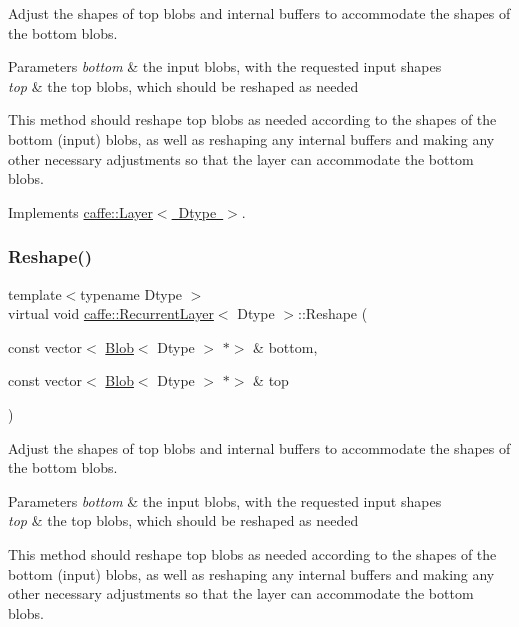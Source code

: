 Adjust the shapes of top blobs and internal buffers to accommodate the shapes of the bottom blobs. 


\begin{DoxyParams}{Parameters}
{\em bottom} & the input blobs, with the requested input shapes \\
\hline
{\em top} & the top blobs, which should be reshaped as needed\\
\hline
\end{DoxyParams}
This method should reshape top blobs as needed according to the shapes of the bottom (input) blobs, as well as reshaping any internal buffers and making any other necessary adjustments so that the layer can accommodate the bottom blobs. 

Implements \mbox{\hyperlink{classcaffe_1_1_layer_a7fe981e8af8d93d587acf2a952be563d}{caffe\+::\+Layer$<$ Dtype $>$}}.

\mbox{\label{classcaffe_1_1_recurrent_layer_aea7d9f8a75896b5bff438c6cdc966b6b}} 
\subsubsection{\texorpdfstring{Reshape()}{Reshape()}\hspace{0.1cm}{\footnotesize\ttfamily [2/2]}}
{\footnotesize\ttfamily template$<$typename Dtype $>$ \\
virtual void \mbox{\hyperlink{classcaffe_1_1_recurrent_layer}{caffe\+::\+Recurrent\+Layer}}$<$ Dtype $>$\+::Reshape (\begin{DoxyParamCaption}\item[{const vector$<$ \mbox{\hyperlink{classcaffe_1_1_blob}{Blob}}$<$ Dtype $>$ $\ast$$>$ \&}]{bottom,  }\item[{const vector$<$ \mbox{\hyperlink{classcaffe_1_1_blob}{Blob}}$<$ Dtype $>$ $\ast$$>$ \&}]{top }\end{DoxyParamCaption})\hspace{0.3cm}{\ttfamily [virtual]}}



Adjust the shapes of top blobs and internal buffers to accommodate the shapes of the bottom blobs. 


\begin{DoxyParams}{Parameters}
{\em bottom} & the input blobs, with the requested input shapes \\
\hline
{\em top} & the top blobs, which should be reshaped as needed\\
\hline
\end{DoxyParams}
This method should reshape top blobs as needed according to the shapes of the bottom (input) blobs, as well as reshaping any internal buffers and making any other necessary adjustments so that the layer can accommodate the bottom blobs. 

